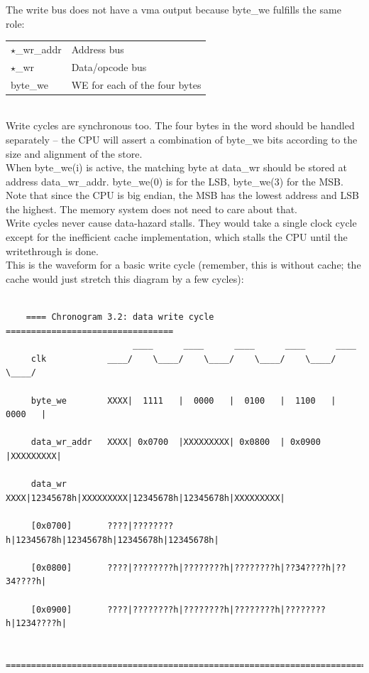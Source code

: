     The write bus does not have a vma output because byte\_we fulfills the same
    role:\\
   
\begin{tabular}{ l l }
    $\star$\_wr\_addr   & Address bus\\
    $\star$\_wr         & Data/opcode bus\\
    byte\_we            & WE for each of the four bytes
\end{tabular}\\

    Write cycles are synchronous too. The four bytes in the word should be
    handled separately -- the CPU will assert a combination of byte\_we bits
    according to the size and alignment of the store.\\

    When byte\_we(i) is active, the matching byte at data\_wr should be stored
    at address data\_wr\_addr. byte\_we(0) is for the LSB, byte\_we(3) for the MSB.
    Note that since the CPU is big endian, the MSB has the lowest address and
    LSB the highest. The memory system does not need to care about that.\\

    Write cycles never cause data-hazard stalls. They would take a single
    clock cycle except for the inefficient cache implementation, which
    stalls the CPU until the writethrough is done.\\

    This is the waveform for a basic write cycle (remember, this is without
    cache; the cache would just stretch this diagram by a few cycles):

\begin{verbatim}

    ==== Chronogram 3.2: data write cycle =================================
                         ____      ____      ____      ____      ____
     clk            ____/    \____/    \____/    \____/    \____/    \____/

     byte_we        XXXX|  1111   |  0000   |  0100   |  1100   |  0000   |

     data_wr_addr   XXXX| 0x0700  |XXXXXXXXX| 0x0800  | 0x0900  |XXXXXXXXX|

     data_wr        XXXX|12345678h|XXXXXXXXX|12345678h|12345678h|XXXXXXXXX|

     [0x0700]       ????|????????h|12345678h|12345678h|12345678h|12345678h|

     [0x0800]       ????|????????h|????????h|????????h|??34????h|??34????h|

     [0x0900]       ????|????????h|????????h|????????h|????????h|1234????h|

    ========================================================================
\end{verbatim}\\

